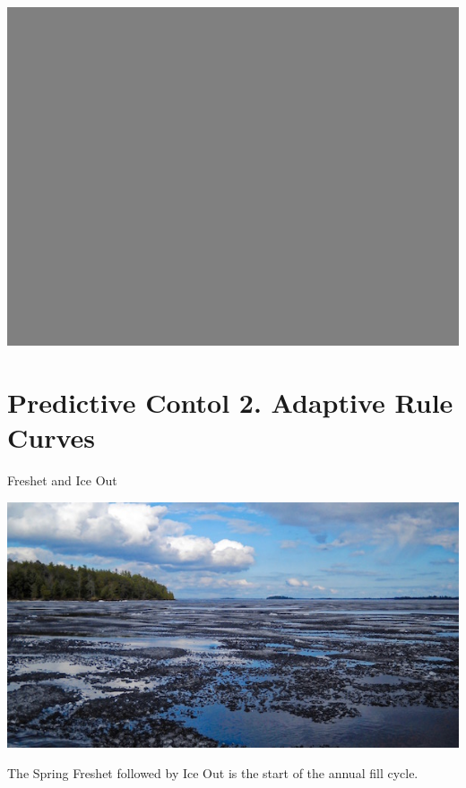 \documentclass[compress,english]{beamer}
\begin{document}

{\usebackgroundtemplate%
	{\includegraphics[width=\paperwidth]{background_grey.png}}
\section{Predictive Contol 2. Adaptive Rule Curves}
}

\begin{frame}{Freshet and Ice Out}

\begin{center}
\includegraphics[width=0.8\paperwidth]{DSCN0059_.jpg}
\end{center}

The Spring Freshet followed by Ice Out is the start of the annual fill cycle.

\end{frame}
\end{document}
